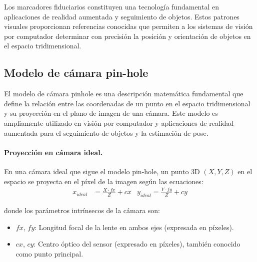 Los marcadores fiduciarios constituyen una tecnología fundamental en aplicaciones de realidad aumentada y seguimiento de objetos. Estos patrones visuales proporcionan referencias conocidas que permiten a los sistemas de visión por computador determinar con precisión la posición y orientación de objetos en el espacio tridimensional.

\subsection{Modelo de cámara pin-hole}

El modelo de cámara \gls{pinhole} es una descripción matemática fundamental que define la relación entre las coordenadas de un punto en el espacio tridimensional y su proyección en el plano de imagen de una cámara. Este modelo es ampliamente utilizado en visión por computador y aplicaciones de realidad aumentada para el seguimiento de objetos y la estimación de pose.

\paragraph{Proyección en cámara ideal.}
En una cámara ideal que sigue el modelo pin-hole, un punto 3D $(X, Y, Z)$ en el espacio se proyecta en el píxel de la imagen según las ecuaciones:
\begin{align*}
	x_{ideal} & = \frac{X \cdot fx}{Z} + cx & y_{ideal} = \frac{Y \cdot fy}{Z} + cy
\end{align*}

donde los parámetros intrínsecos de la cámara son:
\begin{itemize}
	\item $fx$, $fy$: Longitud focal de la lente en ambos ejes (expresada en píxeles).
	\item $cx$, $cy$: Centro óptico del sensor (expresado en píxeles), también conocido como punto principal.
\end{itemize}


